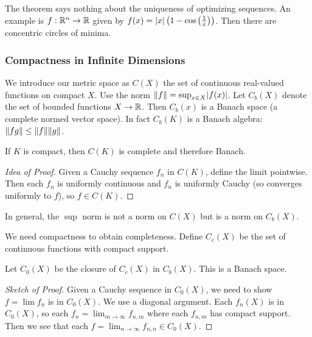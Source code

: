 \documentclass[10pt, twoside]{article}
\begin{document}
    \begin{rmk}
        The theorem says nothing about the uniqueness of optimizing sequences. An example is $f: \mathbb{R}^n \rightarrow \mathbb{R}$ given by $f(x) = \lvert x\rvert\left(1-\cos\left(\frac{1}{x}\right)\right)$. Then there are concentric circles of minima.
    \end{rmk}

    \subsubsection{Compactness in Infinite Dimensions}
    We introduce our metric space as $C(X)$ the set of continuous real-valued functions on compact $X$. Use the norm $\lVert f\rVert = \sup_{x \in X}\lvert f(x)\rvert$. Let $C_b(X)$ denote the set of bounded functions $X \rightarrow \mathbb{R}$. Then $C_b(x)$ is a Banach space (a complete normed vector space). In fact $C_b(K)$ is a Banach algebra: $\lVert fg\rVert \leq \lVert f\rVert \lVert g\rVert$.

    \begin{thm}
        If $K$ is compact, then $C(K)$ is complete and therefore Banach.
    \end{thm}

    \begin{proof}[Idea of Proof]
        Given a Cauchy sequence $f_n$ in $C(K)$, define the limit pointwise. Then each $f_n$ is uniformly continuous and $f_n$ is uniformly Cauchy (so converges uniformly to $f$), so $f \in C(K)$.
    \end{proof}

    \begin{rmk}
        In general, the $\sup$ norm is not a norm on $C(X)$ but is a norm on $C_b(X)$.
    \end{rmk}

    We need compactness to obtain completeness. Define $C_c(X)$ be the set of continuous functions with compact support. 
    
    \begin{thm}
        Let $C_0(X)$ be the closure of $C_c(X)$ in $C_b(X)$. This is a Banach space.
        \begin{proof}[Sketch of Proof]
            Given a Cauchy sequence in $C_0(X)$, we need to show $f = \lim f_n$ is in $C_0(X)$. We use a diagonal argument.
            Each $f_n(X)$ is in $C_0(X)$, so each $f_n = \lim_{m \rightarrow \infty} f_{n,m}$ where each $f_{n,m}$ has compact support. Then we see that each $f = \lim_{n \rightarrow \infty} f_{n,n} \in C_0(X)$.
        \end{proof}
    \end{thm}
\end{document}
